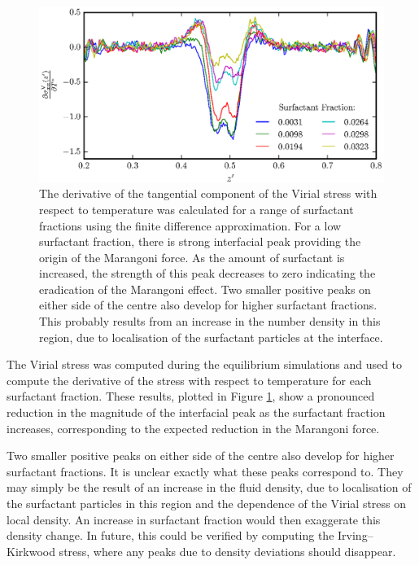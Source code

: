 \begin{figure}[h!]
\centering
\includegraphics[scale=1.0]{SurfForce}
\caption{The derivative of the tangential component of the Virial stress with respect to temperature was calculated for a range of surfactant fractions using the finite difference approximation.
For a low surfactant fraction, there is strong interfacial peak providing the origin of the Marangoni force.
As the amount of surfactant is increased, the strength of this peak decreases to zero indicating the eradication of the Marangoni effect.
Two smaller positive peaks on either side of the centre also develop for higher surfactant fractions.
This probably results from an increase in the number density in this region, due to localisation of the surfactant particles at the interface.
}
\label{SurfForce}
\end{figure}

The Virial stress was computed during the equilibrium simulations and used to compute the derivative of the stress with respect to temperature for each surfactant fraction.
These results, plotted in Figure \ref{SurfForce}, show a pronounced reduction in the magnitude of the interfacial peak as the surfactant fraction increases, corresponding to the expected reduction in the Marangoni force.

Two smaller positive peaks on either side of the centre also develop for higher surfactant fractions.
It is unclear exactly what these peaks correspond to.
They may simply be the result of an increase in the fluid density, due to localisation of the surfactant particles in this region and the dependence of the Virial stress on local density.
An increase in surfactant fraction would then exaggerate this density change.
In future, this could be verified by computing the Irving--Kirkwood stress, where any peaks due to density deviations should disappear.

